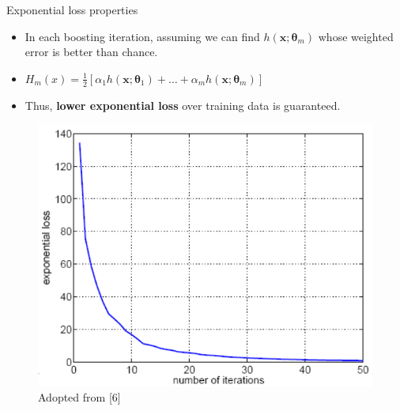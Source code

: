 \documentclass[serif, aspectratio=169]{beamer}
\begin{document}
\begin{frame}{Exponential loss properties}
    \begin{itemize}
        \itemsep1em
        \justifying
        \item In each boosting iteration, assuming we can find $h(\boldsymbol{x};\boldsymbol{\theta}_m)$ whose weighted error is better than chance.
        \item[] \begin{center}
            $H_m(x) = \frac{1}{2}[\alpha_1h(\boldsymbol{x};\boldsymbol{\theta}_1)+ \dots + \alpha_mh(\boldsymbol{x};\boldsymbol{\theta}_m)]$
        \end{center}
        \item Thus, \textbf{lower exponential loss} over training data is guaranteed.
    \end{itemize}
    \vfill
    \begin{center}
        \begin{figure}
            \includegraphics[width=\textwidth]{pic/boosting_exploss.png}
            {\scriptsize Adopted from [6]}
        \end{figure}
        \endminipage
    \end{center}
\end{frame}
\end{document}
